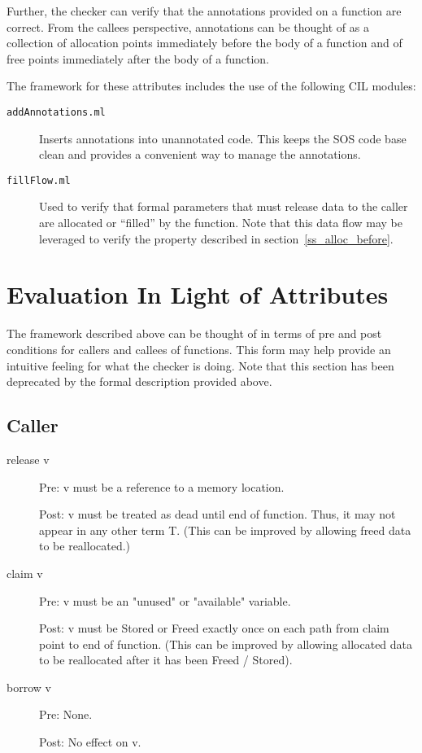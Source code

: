 \documentclass{article}
\begin{document}
Further, the checker can verify that the annotations provided on a function
are correct.  From the callees perspective, annotations can be thought of as a
collection of allocation points immediately before the body of a function and
of free points immediately after the body of a function.


The framework for these attributes includes the use of the following CIL
modules:

\begin{description}
%
\item[\texttt{addAnnotations.ml}]  Inserts annotations into unannotated code.
This keeps the SOS code base clean and provides a convenient way to manage the
annotations.
%
\item[\texttt{fillFlow.ml}] Used to verify that formal parameters that must
release data to the caller are allocated or ``filled'' by the function.  Note
that this data flow may be leveraged to verify the property described
in section~\ref{ss_alloc_before}.
\end{description}



\section{Evaluation In Light of Attributes}

The framework described above can be thought of in terms of pre and post
conditions for callers and callees of functions.  This form may help provide
an intuitive feeling for what the checker is doing.  Note that this section
has been deprecated by the formal description provided above.


\subsection{Caller}

\begin{description}


\item[release v]
        
Pre: v must be a reference to a memory location.

Post: v must be treated as dead until end of function.  Thus, it may not
appear in any other term T.  (This can be improved by allowing freed data to
be reallocated.)

    
\item[claim v]

Pre: v must be an "unused" or "available" variable.

Post: v must be Stored or Freed exactly once on each path from claim point to
end of function.  (This can be improved by allowing allocated data to be
reallocated after it has been Freed / Stored).


\item[borrow v]

Pre: None.

Post: No effect on v.

\end{description}
\end{document}
